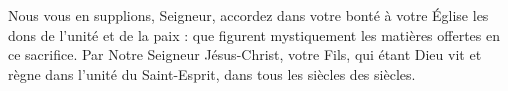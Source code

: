 Nous vous en supplions, Seigneur, accordez dans votre bonté à votre Église les dons de l’unité et de la paix : que figurent mystiquement les matières offertes en ce sacrifice. Par Notre Seigneur Jésus-Christ, votre Fils, qui étant Dieu vit et règne dans l'unité du Saint-Esprit, dans tous les siècles des siècles.
